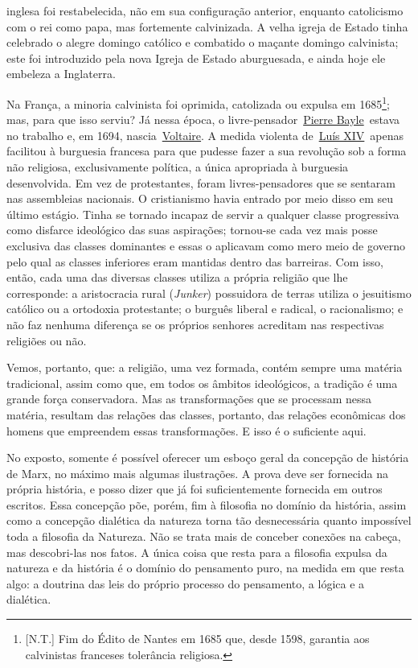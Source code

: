 inglesa foi restabelecida, não em sua configuração anterior, enquanto
catolicismo com o rei como papa, mas fortemente calvinizada. A velha
igreja de Estado tinha celebrado o alegre domingo católico e combatido o
maçante domingo calvinista; este foi introduzido pela nova Igreja de
Estado aburguesada, e ainda hoje ele embeleza a Inglaterra.

Na França, a minoria calvinista foi oprimida, catolizada ou expulsa em
1685\protect\hypertarget{r37}{}{}\footnote{{[}N.T.{]} Fim do Édito de
  Nantes em 1685 que, desde 1598, garantia aos calvinistas franceses
  tolerância religiosa.}; mas, para que isso serviu? Já nessa época, o
livre-pensador~\href{https://www.marxists.org/portugues/dicionario/verbetes/b/bayle_pierre.htm}{Pierre
Bayle}~estava no trabalho e, em 1694,
nascia~\href{https://www.marxists.org/portugues/dicionario/verbetes/v/voltaire.htm}{Voltaire}.
A medida violenta
de~\href{https://www.marxists.org/portugues/dicionario/verbetes/l/luis_14.htm}{Luís
XIV}~apenas facilitou à burguesia francesa para que pudesse fazer a sua
revolução sob a forma não religiosa, exclusivamente política, a única
apropriada à burguesia desenvolvida. Em vez de protestantes, foram
livres-pensadores que se sentaram nas assembleias nacionais. O
cristianismo havia entrado por meio disso em seu último estágio. Tinha
se tornado incapaz de servir a qualquer classe progressiva como disfarce
ideológico das suas aspirações; tornou-se cada vez mais posse exclusiva
das classes dominantes e essas o aplicavam como mero meio de governo
pelo qual as classes inferiores eram mantidas dentro das barreiras. Com
isso, então, cada uma das diversas classes utiliza a própria religião
que lhe corresponde: a aristocracia rural (\emph{Junker}) possuidora de
terras utiliza o jesuitismo católico ou a ortodoxia protestante; o
burguês liberal e radical, o racionalismo; e não faz nenhuma diferença
se os próprios senhores acreditam nas respectivas religiões ou não.

Vemos, portanto, que: a religião, uma vez formada, contém sempre uma
matéria tradicional, assim como que, em todos os âmbitos ideológicos, a
tradição é uma grande força conservadora. Mas as transformações que se
processam nessa matéria, resultam das relações das classes, portanto,
das relações econômicas dos homens que empreendem essas transformações.
E isso é o suficiente aqui.

No exposto, somente é possível oferecer um esboço geral da concepção de
história de Marx, no máximo mais algumas ilustrações. A prova deve ser
fornecida na própria história, e posso dizer que já foi suficientemente
fornecida em outros escritos. Essa concepção põe, porém, fim à filosofia
no domínio da história, assim como a concepção dialética da natureza
torna tão desnecessária quanto impossível toda a filosofia da Natureza.
Não se trata mais de conceber conexões na cabeça, mas descobri-las nos
fatos. A única coisa que resta para a filosofia expulsa da natureza e da
história é o domínio do pensamento puro, na medida em que resta algo: a
doutrina das leis do próprio processo do pensamento, a lógica e a
dialética.


